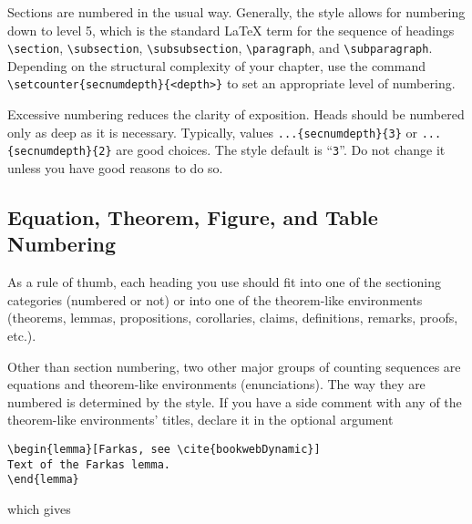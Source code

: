 \documentclass{ics-2015}
\begin{document}
Sections are numbered in the usual
way. Generally, the style allows for numbering down to level 5, which is the
standard LaTeX term for the sequence of headings \verb+\section+,
\verb+\subsection+, \verb+\subsubsection+, \verb+\paragraph+, and
\verb+\subparagraph+. Depending on the structural complexity of your chapter,
use the command \verb+\setcounter{secnumdepth}{<depth>}+ to set an appropriate level of numbering.

Excessive numbering reduces the clarity of exposition. Heads should be numbered only as deep
as it is necessary. Typically, values
\verb+...{secnumdepth}{3}+ or
\verb+...{secnumdepth}{2}+ are good choices. The style default is ``\verb+3+''. Do not change it unless you
have good reasons to do so.

\subsection{Equation, Theorem, Figure, and Table Numbering}%

As a rule of thumb, each heading you use should fit into one
of the sectioning categories (numbered or not) or into one of the
theorem-like environments (theorems, lemmas, propositions, corollaries,
claims, definitions, remarks, proofs, etc.).

Other than section numbering, two other major groups of counting
sequences are equations and theorem-like environments (enunciations).
The way they are numbered is determined by the style.
If you have a side comment with any of the theorem-like environments' titles, declare it
in the optional argument

\begin{verbatim}
\begin{lemma}[Farkas, see \cite{bookwebDynamic}]
Text of the Farkas lemma.
\end{lemma}
\end{verbatim}
which gives
\end{document}
